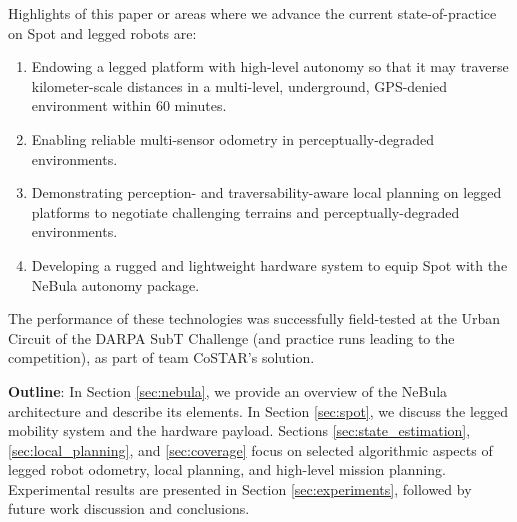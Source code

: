 \documentclass[letterpaper, 10pt, conference]{ieeeconf}      %
\newcommand{\ph}[1]{{\textbf{#1}:}} %
\newcommand{\rev}[1]{{\color{blue}#1}} %
\begin{document}
Highlights of this paper or areas where we advance the current state-of-practice on Spot and legged robots are:
\begin{enumerate}
    \item Endowing a legged platform with high-level autonomy so that it may traverse kilometer-scale distances in a multi-level, underground, GPS-denied environment within 60 minutes. 
    \item Enabling reliable multi-sensor odometry in perceptually-degraded environments.
    \item Demonstrating perception- and traversability-aware local planning on legged platforms to negotiate challenging terrains 
    and perceptually-degraded environments.
    \item Developing a rugged and lightweight hardware system to equip Spot with the NeBula autonomy package. 
\end{enumerate}
The performance of these technologies was successfully field-tested at the Urban Circuit of the DARPA SubT Challenge (and practice runs leading to the competition), as part of team CoSTAR's solution.%

\ph{Outline}
In Section \ref{sec:nebula}, we provide an overview of the NeBula architecture and describe its elements.
In Section \ref{sec:spot}, we discuss the legged mobility system and the hardware payload. Sections \ref{sec:state_estimation}, \ref{sec:local_planning}, and \ref{sec:coverage} focus on selected algorithmic aspects of legged robot odometry, local planning, and high-level mission planning.
Experimental results are presented in Section \ref{sec:experiments}, followed by future work discussion and conclusions.
\end{document}
